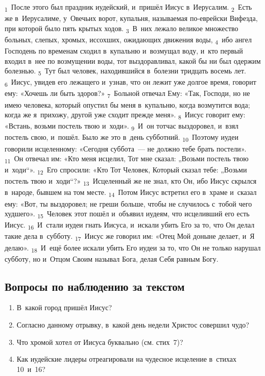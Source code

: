 \documentclass[a4paper,12pt]{article}
\begin{document}
\textsubscript{1}~После этого был праздник иудейский, и~пришёл Иисус в~Иерусалим. \textsubscript{2}~Есть же в~Иерусалиме, у~Овечьих ворот, купальня, называемая по-еврейски Вифезда, при которой было пять крытых ходов. \textsubscript{3}~В~них лежало великое множество больных, слепых, хромых, иссохших, ожидающих движения воды, \textsubscript{4}~ибо ангел Господень по временам сходил в~купальню и~возмущал воду, и~кто первый входил в~нее по возмущении воды, тот выздоравливал, какой бы ни был одержим болезнью. \textsubscript{5}~Тут был человек, находившийся в~болезни тридцать восемь лет. \textsubscript{6}~Иисус, увидев его лежащего и~узнав, что он лежит уже долгое время, говорит ему: «Хочешь ли быть здоров?» \textsubscript{7}~Больной отвечал Ему: «Так, Господи, но не имею человека, который опустил бы меня в~купальню, когда возмутится вода; когда же я~прихожу, другой уже сходит прежде меня». \textsubscript{8}~Иисус говорит ему: «Встань, возьми постель твою и~ходи». \textsubscript{9}~И~он тотчас выздоровел, и~взял постель свою, и~пошёл. Было же это в~день субботний. \textsubscript{10}~Поэтому иудеи говорили исцеленному: «Сегодня суббота~--- не должно тебе брать постели». \textsubscript{11}~Он отвечал им: «Кто меня исцелил, Тот мне сказал: „Возьми постель твою и~ходи“». \textsubscript{12}~Его спросили: «Кто Тот Человек, Который сказал тебе: „Возьми постель твою и~ходи“?» \textsubscript{13}~Исцеленный же не знал, кто Он, ибо Иисус скрылся в~народе, бывшем на том месте. \textsubscript{14}~Потом Иисус встретил его в~храме и~сказал ему: «Вот, ты выздоровел; не греши больше, чтобы не случилось с~тобой чего худшего». \textsubscript{15}~Человек этот пошёл и~объявил иудеям, что исцеливший его есть Иисус. \textsubscript{16}~И~стали иудеи гнать Иисуса, и~искали убить Его за то, что Он делал такие дела в~субботу. \textsubscript{17}~Иисус же говорил им: «Отец Мой доныне делает, и~Я делаю». \textsubscript{18}~И~ещё более искали убить Его иудеи за то, что Он не только нарушал субботу, но и~Отцом Своим называл Бога, делая Себя равным Богу. 

\subsection*{Вопросы по наблюдению за текстом}
\begin{enumerate}
    \item В~какой город пришёл Иисус? 
    
    \myline
    
    \item Согласно данному отрывку, в~какой день недели Христос совершил чудо? 
    
    \myline
    \item Что хромой хотел от Иисуса буквально (см. стих~7)? 
    
    \myline
    
    \myline
    \item Как иудейские лидеры отреагировали на чудесное исцеление в~стихах 10~и~16? 
    
    \myline
    
    \myline
\end{enumerate}
\end{document}
